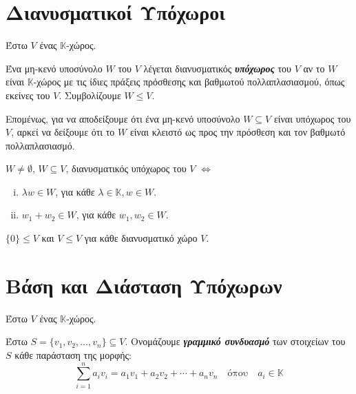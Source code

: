 








\renewcommand{\arraystretch}{1.2}

\begin{center}
\end{center}

\vspace{\baselineskip}

\section{Διανυσματικοί Υπόχωροι}

Έστω $V$ ένας $\mathbb{K}$-χώρος.

\begin{dfn}
Ένα μη-κενό υποσύνολο $W$ του $V$ λέγεται διανυσματικός \textbf{\textit{υπόχωρος}} του $V$ αν το $W$ είναι $\mathbb{K}$-χώρος με τις ίδιες πράξεις πρόσθεσης και βαθμωτού πολλαπλασιασμού, όπως εκείνες του $V$. Συμβολίζουμε $W\leq V$.
\end{dfn}

Επομένως, για να αποδείξουμε ότι ένα μη-κενό υποσύνολο $W\subseteq V$ είναι υπόχωρος του $V$, αρκεί να δείξουμε ότι το $W$ είναι κλειστό ως προς την πρόσθεση και τον βαθμωτό πολλαπλασιασμό.

\begin{prop}
$W\neq \emptyset$, $W\subseteq V$, διανυσματικός υπόχωρος του $V$ $\Leftrightarrow$
\begin{enumerate}[i.]
\item $\lambda w\in W$, για κάθε $\lambda\in \mathbb{K}, w\in W$.
\item $w_1+w_2\in W$, για κάθε $w_1, w_2\in W$.
\end{enumerate}
\end{prop}

\begin{prop}
$\{0\}\leq V$ και $V\leq V$ για κάθε διανυσματικό χώρο $V$.
\end{prop}

\section{Βάση και Διάσταση Υπόχωρων}

Έστω $V$ ένας $\mathbb{K}$-χώρος.


\begin{dfn} Έστω $S=\{v_1,v_2,\ldots,v_n\}\subseteq V$. Ονομάζουμε \textbf{\textit{γραμμικό συνδυασμό}} των στοιχείων του $S$ κάθε παράσταση της μορφής:
\[
\sum_{i=1}^{n}a_iv_i=a_1v_1+a_2v_2+\cdots +a_nv_n \quad\text{όπου}\quad a_i\in \mathbb{K}
\]
\end{dfn}

